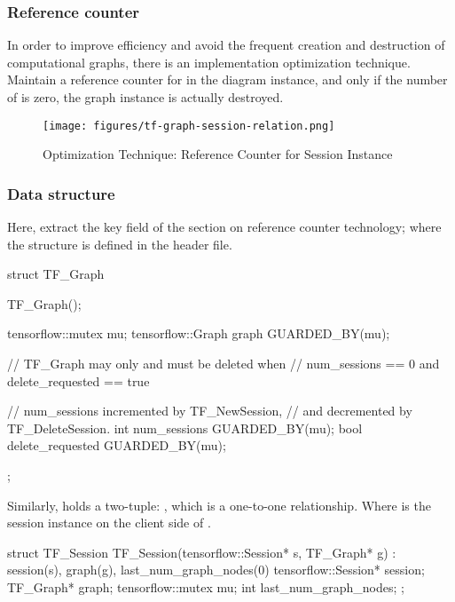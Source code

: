 \begin{content}
\subsubsection{Reference counter}
In order to improve efficiency and avoid the frequent creation and destruction of computational graphs, there is an implementation optimization technique. Maintain a reference counter for  in the diagram instance, and only if the number of  is zero, the graph instance is actually destroyed.

\begin{figure}[!htbp]
  \centering
  \texttt{[image: figures/tf-graph-session-relation.png]}
  \caption{Optimization Technique: Reference Counter for Session Instance}
  \label{fig:tf-graph-session-relation}
\end{figure}


\subsubsection{Data structure}
Here, extract the key field of the  section on  reference counter technology; where the  structure is defined in the  header file.

\begin{leftbar}
\begin{c++}
struct TF_Graph {
  TF_Graph();

  tensorflow::mutex mu;
  tensorflow::Graph graph GUARDED_BY(mu);

  // TF\_Graph may only and must be deleted when
  // num\_sessions == 0 and delete\_requested == true

  // num\_sessions incremented by TF\_NewSession, 
  // and decremented by TF\_DeleteSession.
  int num_sessions GUARDED_BY(mu);
  bool delete_requested GUARDED_BY(mu);
};
\end{c++}
\end{leftbar}

Similarly,  holds a two-tuple: , which is a one-to-one relationship. Where  is the session instance on the client side of .

\begin{leftbar}
\begin{c++}
struct TF_Session {
  TF_Session(tensorflow::Session* s, TF_Graph* g)
      : session(s), graph(g), last_num_graph_nodes(0) {}
  tensorflow::Session* session;
  TF_Graph* graph;
  tensorflow::mutex mu;
  int last_num_graph_nodes;
};
\end{c++}
\end{leftbar}



\end{content}
